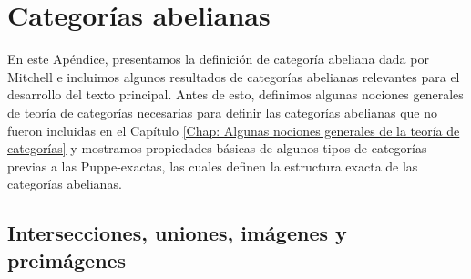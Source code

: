 \documentclass[tesis]{subfiles}
\begin{document}
\chapter{Categorías abelianas}\label{Chap: Categorías abelianas}

En este Apéndice, presentamos la definición de categoría abeliana dada por Mitchell\cite{Mitchell} e incluimos algunos resultados de categorías abelianas relevantes para el desarrollo del texto principal. Antes de esto, definimos algunas nociones generales de teoría de categorías necesarias para definir las categorías abelianas que no fueron incluidas en el Capítulo \ref{Chap: Algunas nociones generales de la teoría de categorías} y mostramos propiedades básicas de algunos tipos de categorías previas a las Puppe-exactas, las cuales definen la estructura exacta de las categorías abelianas.

\section{Intersecciones, uniones, imágenes y preimágenes} \label{Sec: Intersecciones, uniones, imágenes y preimágenes}
\end{document}
